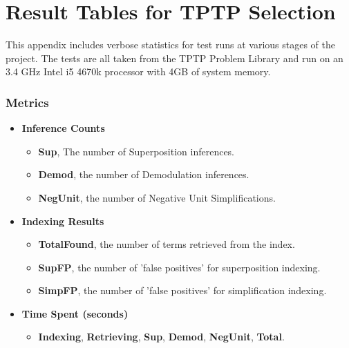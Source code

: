 
\appendix

\chapter{Result Tables for TPTP Selection}
\label{app:app1}

\vspace{-1cm}

This appendix includes verbose statistics for test runs at various stages of the
project. The tests are all taken from the TPTP Problem Library \cite{tptp} and run on an 3.4 GHz Intel i5 4670k processor with 4GB of system memory.

\subsection{Metrics}

\begin{itemize}
\item\textbf{Inference Counts}
\begin{itemize}
\item \textbf{Sup}, The number of Superposition inferences. 
\item \textbf{Demod}, the number of Demodulation inferences.
\item \textbf{NegUnit}, the number of Negative Unit Simplifications.
\end{itemize}
\item\textbf{Indexing Results}
\begin{itemize}
\item \textbf{TotalFound}, the number of terms retrieved from the index.
\item \textbf{SupFP}, the number of 'false positives' for superposition indexing.
\item \textbf{SimpFP}, the number of 'false positives' for simplification indexing.
\end{itemize}
\item\textbf{Time Spent (seconds)}
\begin{itemize}
\item \textbf{Indexing}, \textbf{Retrieving}, \textbf{Sup}, \textbf{Demod}, \textbf{NegUnit}, \textbf{Total}.
\end{itemize}
\end{itemize}

